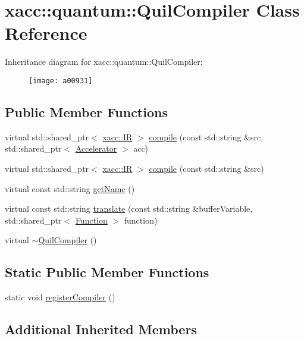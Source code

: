 \hypertarget{a00931}{}\section{xacc\+:\+:quantum\+:\+:Quil\+Compiler Class Reference}
\label{a00931}
Inheritance diagram for xacc\+:\+:quantum\+:\+:Quil\+Compiler\+:\begin{figure}[H]
\begin{center}
\leavevmode
\texttt{[image: a00931]}
\end{center}
\end{figure}
\subsection*{Public Member Functions}
\begin{DoxyCompactItemize}
\item 
virtual std\+::shared\+\_\+ptr$<$ \hyperlink{a01175}{xacc\+::\+IR} $>$ \hyperlink{a00931_a2421482415ca4e09963ea4ecddff8100}{compile} (const std\+::string \&src, std\+::shared\+\_\+ptr$<$ \hyperlink{a01111}{Accelerator} $>$ acc)
\item 
virtual std\+::shared\+\_\+ptr$<$ \hyperlink{a01175}{xacc\+::\+IR} $>$ \hyperlink{a00931_adf4d321ecb0df3fa7728999f941c83b2}{compile} (const std\+::string \&src)
\item 
virtual const std\+::string \hyperlink{a00931_ae7d52140b6dd52730edc6e38ae48f437}{get\+Name} ()
\item 
virtual const std\+::string \hyperlink{a00931_a66ca00bbb1f30e7bc6dd86b1e267b93b}{translate} (const std\+::string \&buffer\+Variable, std\+::shared\+\_\+ptr$<$ \hyperlink{a01151}{Function} $>$ function)
\item 
virtual \hyperlink{a00931_a0866a9f695f28c90ac1f4754374f3bfe}{$\sim$\+Quil\+Compiler} ()
\end{DoxyCompactItemize}
\subsection*{Static Public Member Functions}
\begin{DoxyCompactItemize}
\item 
static void \hyperlink{a00931_aaec99a14bede717bf02a0f65af2a3c69}{register\+Compiler} ()
\end{DoxyCompactItemize}
\subsection*{Additional Inherited Members}


